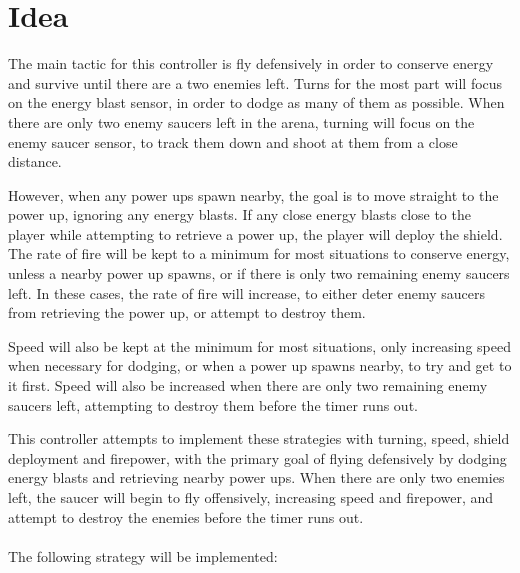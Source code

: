 \section{Idea}

The main tactic for this controller is fly defensively in order to conserve energy and survive until there are a two enemies left. Turns for the most part will focus on the energy blast sensor, in order to dodge as many of them as possible. When there are only two enemy saucers left in the arena, turning will focus on the enemy saucer sensor, to track them down and shoot at them from a close distance.

However, when any power ups spawn nearby, the goal is to move straight to the power up, ignoring any energy blasts. If any close energy blasts close to the player while attempting to retrieve a power up, the player will deploy the shield. The rate of fire will be kept to a minimum for most situations to conserve energy, unless a nearby power up spawns, or if there is only two remaining enemy saucers left. In these cases, the rate of fire will increase, to either deter enemy saucers from retrieving the power up, or attempt to destroy them.

Speed will also be kept at the minimum for most situations, only increasing speed when necessary for dodging, or when a power up spawns nearby, to try and get to it first. Speed will also be increased when there are only two remaining enemy saucers left, attempting to destroy them before the timer runs out.

This controller attempts to implement these strategies with turning, speed, shield deployment and firepower, with the primary goal of flying defensively by dodging energy blasts and retrieving nearby power ups. When there are only two enemies left, the saucer will begin to fly offensively, increasing speed and firepower, and attempt to destroy the enemies before the timer runs out.
\\
\\
The following strategy will be implemented:

